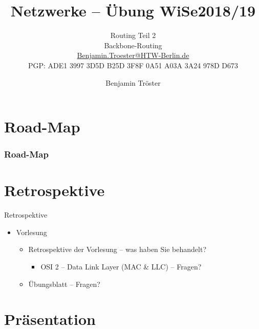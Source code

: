 \documentclass[xcolor=dvipsnames, aspectratio=169]{beamer}
\begin{document}

\title{Netzwerke -- Übung WiSe2018/19}
\subtitle{Routing Teil 2\\
		Backbone-Routing\\
		\href{mailto:Benjamin.Troester@HTW-Berlin.de}{Benjamin.Troester@HTW-Berlin.de}\\
		PGP: ADE1 3997 3D5D B25D 3F8F 0A51 A03A 3A24 978D D673 }
\author{Benjamin Tröster}

\date{}

\begin{frame}
\titlepage

\end{frame}

\section*{Road-Map}
\begin{frame}
\frametitle{Road-Map}
\begin{multicols}{2}
  \tableofcontents
\end{multicols}
\end{frame}

\section{Retrospektive}
\begin{frame}{Retrospektive}
\begin{itemize}
	\item Vorlesung
	\begin{itemize}
		\item Retrospektive der Vorlesung -- was haben Sie behandelt?
		\begin{itemize}
			\item OSI 2 -- Data Link Layer (MAC \& LLC) -- Fragen?
		\end{itemize}
		\item Übungsblatt -- Fragen?
	\end{itemize}
\end{itemize}
\end{frame}


\section{Präsentation}
\end{document}
